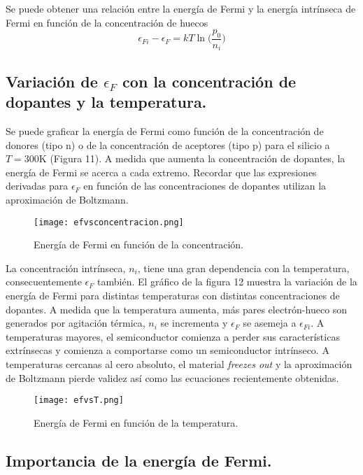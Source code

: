 \documentclass[12pt,a4paper]{article}
\begin{document}
Se puede obtener una relación entre la energía de Fermi y la energía intrínseca de Fermi en función de la concentración de huecos
\[ \epsilon _{Fi} - \epsilon _{F} = kT \ln \bigg( \frac{p_{0}}{n_{i}} \bigg)  \]

\subsection{Variación de $\epsilon _{F}$ con la concentración de dopantes y la temperatura.}

Se puede graficar la energía de Fermi como función de la concentración de donores (tipo n) o de la concentración de aceptores (tipo p) para el silicio a $T=300$K (Figura 11). A medida que aumenta la concentración de dopantes, la energía de Fermi se acerca a cada extremo. Recordar que las expresiones derivadas para $\epsilon _{F}$ en función de las concentraciones de dopantes utilizan la aproximación de Boltzmann.

\begin{figure}[ht!]
\begin{center}
\texttt{[image: efvsconcentracion.png]}
\caption{Energía de Fermi en función de la concentración.}
\end{center}
\end{figure}

La concentración intrínseca, $n_{i}$, tiene una gran dependencia con la temperatura, consecuentemente $\epsilon _{F}$ también. El gráfico de la figura 12 muestra la variación de la energía de Fermi para distintas temperaturas con distintas concentraciones de dopantes. A medida que la temperatura aumenta, más pares electrón-hueco son generados por agitación térmica, $n_{i}$ se incrementa y $\epsilon _{F}$ se asemeja a $\epsilon _{Fi}$. A temperaturas mayores, el semiconductor comienza a perder sus características extrínsecas y comienza a comportarse como un semiconductor intrínseco. A temperaturas cercanas al cero absoluto, el material \emph{freezes out} y la aproximación de Boltzmann pierde validez así como las ecuaciones recientemente obtenidas.

\begin{figure}[ht!]
\begin{center}
\texttt{[image: efvsT.png]}
\caption{Energía de Fermi en función de la temperatura.}
\end{center}
\end{figure}

\subsection{Importancia de la energía de Fermi.}
\end{document}
